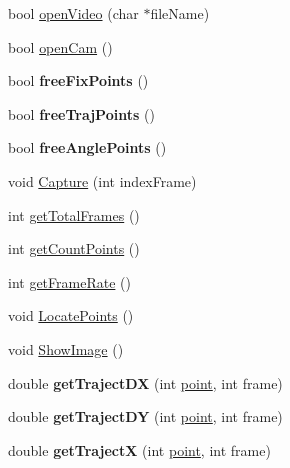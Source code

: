 \begin{DoxyCompactItemize}
\item 
bool \hyperlink{classmodel_1_1ProxyOpenCv_ab4bf5c932ea8fbcae6bcc8daa1e9f10e}{openVideo} (char $\ast$fileName)
\item 
bool \hyperlink{classmodel_1_1ProxyOpenCv_a9ff5705fa6f588f8798ef45ba4d732cd}{openCam} ()
\item 
\hypertarget{classmodel_1_1ProxyOpenCv_a6c175329e93c656baf3d06bd19e68217}{
bool {\bfseries freeFixPoints} ()}
\label{classmodel_1_1ProxyOpenCv_a6c175329e93c656baf3d06bd19e68217}

\item 
\hypertarget{classmodel_1_1ProxyOpenCv_aabf48b789ce6e2e8204e8fba69128519}{
bool {\bfseries freeTrajPoints} ()}
\label{classmodel_1_1ProxyOpenCv_aabf48b789ce6e2e8204e8fba69128519}

\item 
\hypertarget{classmodel_1_1ProxyOpenCv_aa076557b968cb6d3ab0f67e4a4038b46}{
bool {\bfseries freeAnglePoints} ()}
\label{classmodel_1_1ProxyOpenCv_aa076557b968cb6d3ab0f67e4a4038b46}

\item 
void \hyperlink{classmodel_1_1ProxyOpenCv_a561e5faa91963907f389399d3d002571}{Capture} (int indexFrame)
\item 
int \hyperlink{classmodel_1_1ProxyOpenCv_a2d81f95b4bdbae8ea20aeda36e2e39ec}{getTotalFrames} ()
\item 
int \hyperlink{classmodel_1_1ProxyOpenCv_a6d174bb01082abcce74ac99c8726f22c}{getCountPoints} ()
\item 
int \hyperlink{classmodel_1_1ProxyOpenCv_a4ffc74c0436e449643154231d7796117}{getFrameRate} ()
\item 
void \hyperlink{classmodel_1_1ProxyOpenCv_a3117c636b0aaee162cb2aa7ee1d5daa8}{LocatePoints} ()
\item 
void \hyperlink{classmodel_1_1ProxyOpenCv_a9e0afec9f2078a293bdb1eff8fdba995}{ShowImage} ()
\item 
\hypertarget{classmodel_1_1ProxyOpenCv_ae7c8991b21e3ae55772a74a7736adeec}{
double {\bfseries getTrajectDX} (int \hyperlink{structpoint}{point}, int frame)}
\label{classmodel_1_1ProxyOpenCv_ae7c8991b21e3ae55772a74a7736adeec}

\item 
\hypertarget{classmodel_1_1ProxyOpenCv_a78fc0d910ea5cd90b8fd8c8ad492753b}{
double {\bfseries getTrajectDY} (int \hyperlink{structpoint}{point}, int frame)}
\label{classmodel_1_1ProxyOpenCv_a78fc0d910ea5cd90b8fd8c8ad492753b}

\item 
\hypertarget{classmodel_1_1ProxyOpenCv_a8755e50212f7d31adfcc96e961d7855c}{
double {\bfseries getTrajectX} (int \hyperlink{structpoint}{point}, int frame)}
\label{classmodel_1_1ProxyOpenCv_a8755e50212f7d31adfcc96e961d7855c}


\end{DoxyCompactItemize}
